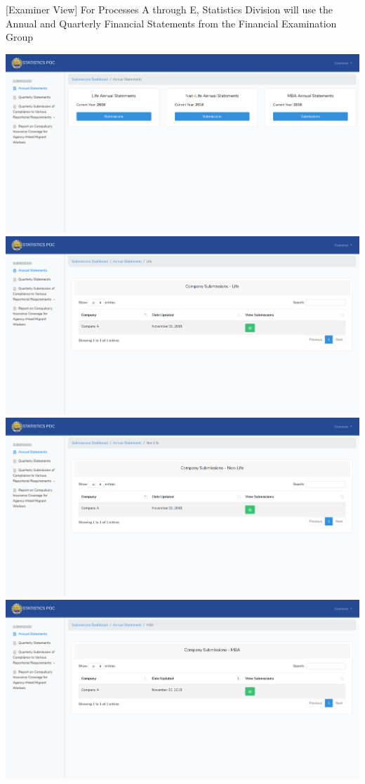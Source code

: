 \documentclass{article}
\begin{document}
[Examiner View] For Processes A through E, Statistics
Division will use the Annual and Quarterly Financial Statements from the
Financial Examination Group%

\includegraphics[keepaspectratio=true]{up-ic-screens/image80}{}\includegraphics[keepaspectratio=true]{up-ic-screens/image23}{}\includegraphics[keepaspectratio=true]{up-ic-screens/image104}{}\includegraphics[keepaspectratio=true]{up-ic-screens/image147}{}%
\end{document}
